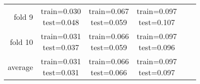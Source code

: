 \documentclass[12pt]{article}
\begin{document}
\begin{tabular}{ r|c|c|c|c|c| }
fold 9 & \shortstack{train=0.030 \\ test=0.048}& \shortstack{train=0.067 \\ test=0.059}& \shortstack{train=0.097 \\ test=0.107} \\\cline{2-4}
fold 10 & \shortstack{train=0.031 \\ test=0.037}& \shortstack{train=0.066 \\ test=0.059}& \shortstack{train=0.097 \\ test=0.096} \\\cline{2-4}
average & \shortstack{train=0.031 \\ test=0.031}& \shortstack{train=0.066 \\ test=0.066}& \shortstack{train=0.097 \\ test=0.097} \\\cline{2-4}
\end{tabular}
\end{document}

